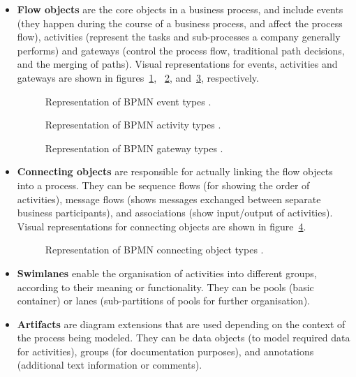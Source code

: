 \documentclass[11pt, a4paper, oneside, openright]{article}
\begin{document}
\begin{itemize}
  \item \textbf{Flow objects} are the core objects in a business process, and
  include events (they happen during the course of a business process, and
  affect the process flow), activities (represent the tasks and sub-processes a
  company generally performs) and gateways (control the process flow,
  traditional path decisions, and the merging of paths). Visual representations
  for events, activities and gateways are shown in figures~\ref{fig:eventTypes},
  ~\ref{fig:activityTypes}, and~\ref{fig:gatewayTypes}, respectively.

  \begin{figure}[!ht]
  \centerline{}
  \caption{Representation of BPMN event types \cite{bpmWiki}.}
  \label{fig:eventTypes}
  \end{figure}

  \begin{figure}[!ht]
  \centerline{}
  \caption{Representation of BPMN activity types \cite{bpmWiki}.}
  \label{fig:activityTypes}
  \end{figure}

  \begin{figure}[!ht]
  \centerline{}
  \caption{Representation of BPMN gateway types \cite{bpmWiki}.}
  \label{fig:gatewayTypes}
  \end{figure}

  \item \textbf{Connecting objects} are responsible for actually linking the
  flow objects into a process. They can be sequence flows (for showing the order
  of activities), message flows (shows messages exchanged between separate
  business participants), and associations (show input/output of activities).
  Visual representations for connecting objects are shown in figure~\ref{fig:connectionTypes}.

  \begin{figure}[!ht]
  \centerline{}
  \caption{Representation of BPMN connecting object types \cite{bpmWiki}.}
  \label{fig:connectionTypes}
  \end{figure}

  \item \textbf{Swimlanes} enable the organisation of activities into different
  groups, according to their meaning or functionality. They can be pools (basic
  container) or lanes (sub-partitions of pools for further organisation).
  \item \textbf{Artifacts} are diagram extensions that are used depending on the
  context of the process being modeled. They can be data objects (to model
  required data for activities), groups (for documentation purposes), and
  annotations (additional text information or comments).

\end{itemize}
\end{document}
